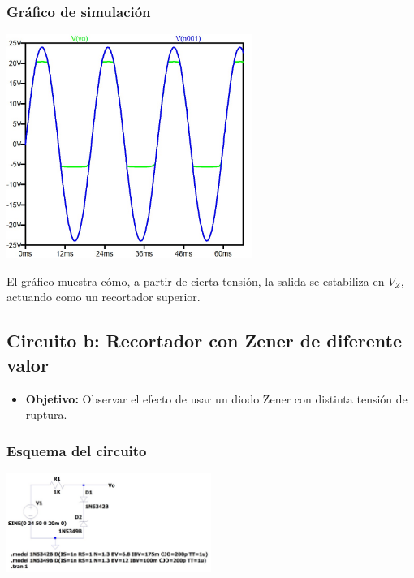 \documentclass[chaptersright]{informeutn}
\begin{document}
\subsubsection*{Gráfico de simulación}
\begin{center}
    \includegraphics[width=0.6\textwidth]{pictures/zener_1_grafico.jpeg}
\end{center}

\noindent
El gráfico muestra cómo, a partir de cierta tensión, la salida se estabiliza en \( V_Z \), actuando como un recortador superior.


\subsection*{Circuito b: Recortador con Zener de diferente valor}

\begin{itemize}
    \item \textbf{Objetivo:} Observar el efecto de usar un diodo Zener con distinta tensión de ruptura.
\end{itemize}

\subsubsection*{Esquema del circuito}
\begin{center}
    \includegraphics[width=0.5\textwidth]{pictures/zener_2_circuito.jpeg}
\end{center}
\end{document}
